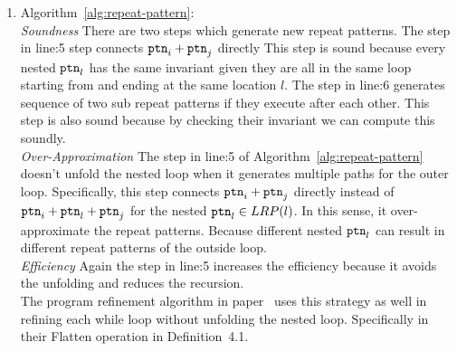 \begin{enumerate}
  \item
Algorithm~\ref{alg:repeat-pattern}:
\\
\emph{Soundness}
There are two steps which generate new repeat patterns.
The step in line:5 step connects  $\mathtt{ptn}_i +\mathtt{ptn}_j$ directly
This step is sound because every nested $\mathtt{ptn}_l$
has the same invariant given they are all in the same loop starting from and ending at the same location $l$.
The step in line:6 generates sequence of two sub repeat patterns if they execute after each other.
This step is also sound because by checking their invariant we can compute this soundly.
\\
\emph{Over-Approximation}
The step in line:5 of Algorithm~\ref{alg:repeat-pattern} doesn't unfold the nested loop when it generates multiple paths for the outer loop.
Specifically, this step connects  $\mathtt{ptn}_i +\mathtt{ptn}_j$ directly
instead of $\mathtt{ptn}_i + \mathtt{ptn}_l + \mathtt{ptn}_j$ for the nested $\mathtt{ptn}_l \in LRP(l)$. 
In this sense, it over-approximate the repeat patterns.
Because different nested $\mathtt{ptn}_l$ can result in different repeat patterns of the outside loop.
\\
\emph{Efficiency}
Again the step in line:5 increases the efficiency because it avoids the unfolding and reduces  the recursion.
\\
The program refinement algorithm in paper~\cite{GulwaniJK09} uses this strategy as well in refining each while loop without unfolding the nested loop.
Specifically in their Flatten operation in Definition~4.1.

\end{enumerate}
